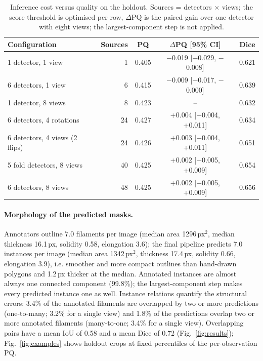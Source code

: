 \documentclass[sigconf]{acmart}
\begin{document}
\begin{table}[t]
\centering\small\setlength{\tabcolsep}{1.5pt}
\caption{Inference cost versus quality on the holdout. Sources = detectors $\times$ views; the score threshold is optimised per row, $\Delta$PQ is the paired gain over one detector with eight views; the largest-component step is not applied.}
\label{tab:variants}
\begin{tabular}{@{}lrccc@{}}
\toprule
 Configuration & Sources & PQ & $\Delta$PQ [95\% CI] & Dice \\
\midrule
1 detector, 1 view & 1 & 0.405 & $-$0.019 [$-$0.029, $-$0.008] & 0.621 \\
6 detectors, 1 view & 6 & 0.415 & $-$0.009 [$-$0.017, $-$0.000] & 0.639 \\
1 detector, 8 views & 8 & 0.423 & -- & 0.632 \\
6 detectors, 4 rotations & 24 & 0.427 & +0.004 [$-$0.004, +0.011] & 0.634 \\
6 detectors, 4 views (2 flips) & 24 & 0.426 & +0.003 [$-$0.004, +0.011] & 0.651 \\
5 fold detectors, 8 views & 40 & 0.425 & +0.002 [$-$0.005, +0.009] & 0.654 \\
6 detectors, 8 views & 48 & 0.425 & +0.002 [$-$0.005, +0.009] & 0.656 \\
\bottomrule
\end{tabular}
\end{table}

\paragraph{Morphology of the predicted masks.}
Annotators outline 7.0 filaments per image (median area 1296\,px$^2$, median thickness 16.1\,px, solidity 0.58, elongation 3.6); the final pipeline predicts 7.0 instances per image (median area 1342\,px$^2$, thickness 17.4\,px, solidity 0.66, elongation 3.9), i.e. smoother and more compact outlines than hand-drawn polygons and 1.2\,px thicker at the median. Annotated instances are almost always one connected component (99.8\%); the largest-component step makes every predicted instance one as well. Instance relations quantify the structural errors: 3.4\% of the annotated filaments are overlapped by two or more predictions (one-to-many; 3.2\% for a single view) and 1.8\% of the predictions overlap two or more annotated filaments (many-to-one; 3.4\% for a single view). Overlapping pairs have a mean IoU of 0.58 and a mean Dice of 0.72 (Fig.~\ref{fig:results}); Fig.~\ref{fig:examples} shows holdout crops at fixed percentiles of the per-observation PQ.
\end{document}
